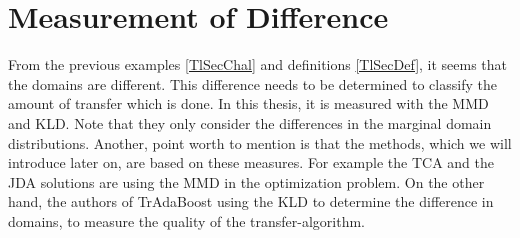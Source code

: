 \section{Measurement of Difference}\label{TlSecMeasure}
From the previous examples \ref{TlSecChal} and definitions \ref{TlSecDef}, it seems that the domains are different.
This difference needs to be determined to classify the amount of transfer which is done.
In this thesis, it is measured with the \ac{MMD} and \ac{KLD}.
Note that they only consider the differences in the marginal domain distributions.
Another, point worth to mention is that the methods, which we will introduce later on, are based on these measures.
For example the \acl{TCA} and the \acl{JDA} solutions are using the \acs{MMD} in the optimization problem.
On the other hand, the authors of TrAdaBoost using the \acs{KLD} to determine the difference in domains, to measure the quality of the transfer-algorithm.

